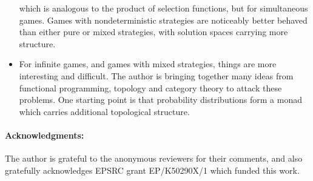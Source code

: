 \documentclass{article}
\begin{document}
\begin{itemize}
which is analogous to the product of selection functions, but for simultaneous games. Games with nondeterministic strategies are noticeably better behaved than either pure or mixed strategies, with solution spaces carrying more structure.

\item For infinite games, and games with mixed strategies, things are more interesting and difficult. The author is bringing together many ideas from functional programming, topology and category theory to attack these problems. One starting point is that probability distributions form a monad \citep{giry82, erwig06} which carries additional topological structure.
\end{itemize}

\paragraph{Acknowledgments:}
The author is grateful to the anonymous reviewers for their comments, and also gratefully acknowledges EPSRC grant EP/K50290X/1 which funded this work.



\end{document}
